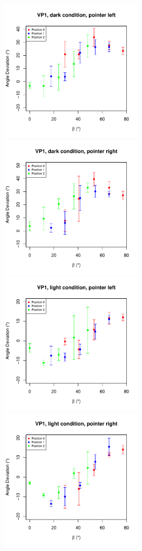 \begin{figure}
    \includegraphics[width = 7cm]{Images/plots/AngleDevVP1DarkLeft.pdf}
    \includegraphics[width = 7cm]{Images/plots/AngleDevVP1DarkRight.pdf}
    \includegraphics[width = 7cm]{Images/plots/AngleDevVP1LightLeft.pdf}
    \includegraphics[width = 7cm]{Images/plots/AngleDevVP1LightRight.pdf}

\end{figure}
